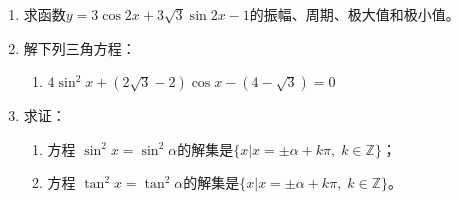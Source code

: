 \begin{enumerate}
\item 求函数$y=3\cos 2x+3\sqrt{3}\sin 2x-1$的振幅、周期、极大值和极小值。
\item 解下列三角方程：
 \begin{enumerate}
\item $4\sin ^{2} x+(2 \sqrt{3}-2) \cos x-(4-\sqrt{3})=0$
\end{enumerate}   

\item 求证：
\begin{enumerate}
    \item 方程 $\sin^2x=\sin^2\alpha$的解集是$\{x|x=\pm \alpha+k\pi,\; k\in\mathbb{Z}\}$；
    \item 方程 $\tan^2x=\tan^2\alpha$的解集是$\{x|x=\pm \alpha+k\pi,\; k\in\mathbb{Z}\}$。
\end{enumerate}
\end{enumerate}
